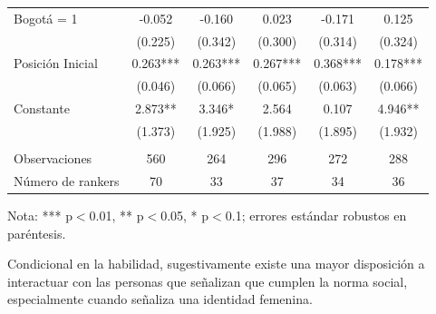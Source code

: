 \begin{table}[ht!]
\begin{threeparttable}
{\begin{tabular}{lccccc}
    Bogotá = 1                                  &   -0.052	&   -0.160	&   0.023   &   -0.171	        &   0.125               \\
                                                &   (0.225)	&   (0.342)	&   (0.300) &   (0.314)	        &   (0.324)             \\
    Posición Inicial                            &  0.263***	&  0.263***	&  0.267*** &   0.368***    	&   0.178***            \\
                                                &   (0.046)	&   (0.066)	&   (0.065) &   (0.063)         &	(0.066)             \\
    Constante                                   &   2.873**	&   3.346*	&   2.564   &    0.107	        &   4.946**             \\
                                                &   (1.373)	&   (1.925)	&   (1.988) &   (1.895)	        &   (1.932)             \\
                                                &           &           &           &                   &                       \\
    Observaciones                               &   560     &   264     &   296     &   272             &   288                 \\
    Número de rankers                           &   70      &   33      &   37      &   34              &   36                  \\ \hline \hline
    \end{tabular}}
    \begin{tablenotes}
    \scriptsize{
    \item Nota: *** p$<$0.01, ** p$<$0.05, * p$<$0.1; errores estándar robustos en paréntesis.}
    \end{tablenotes}
    \end{threeparttable}
\end{table}

\begin{result}
Condicional en la habilidad, sugestivamente existe una mayor disposición a interactuar con las personas que señalizan que cumplen la norma social, especialmente cuando señaliza una identidad femenina. 
\end{result}

